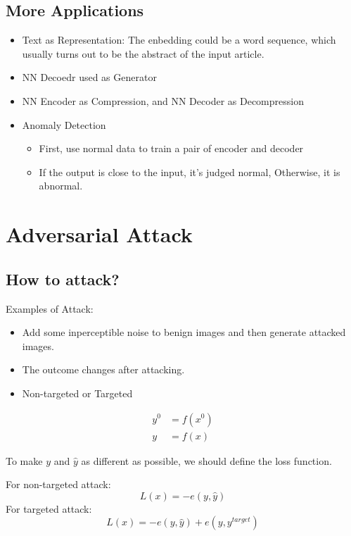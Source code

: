 \documentclass[11pt]{book}
\begin{document}
\section{More Applications}
\begin{itemize}
    \item Text as Representation: The enbedding could be a word sequence, which usually turns out to be the abstract of the input article.
    \item NN Decoedr used as Generator
    \item NN Encoder as Compression, and NN Decoder as Decompression
    \item Anomaly Detection
    \begin{itemize}
        \item First, use normal data to train a pair of encoder and decoder
        \item If the output is close to the input, it's judged normal, Otherwise, it is abnormal.
    \end{itemize}
\end{itemize}

\chapter{Adversarial Attack}
\section{How to attack?}
Examples of Attack:
\begin{itemize}
    \item Add some inperceptible noise to benign images and then generate attacked images.
    \item The outcome changes after attacking.
    \item Non-targeted or Targeted
\end{itemize}
\begin{displaymath}
    \begin{aligned}
        y^0&=f(x^0)\\
        y&=f(x)
    \end{aligned}
\end{displaymath}

To make $y$ and $\hat{y}$ as different as possible, we should define the loss function.

For non-targeted attack:
\begin{displaymath}
    L(x)=-e(y,\hat{y})
\end{displaymath}
For targeted attack:
\begin{displaymath}
    L(x)=-e(y,\hat{y})+e(y,y^{target})
\end{displaymath}
\end{document}

